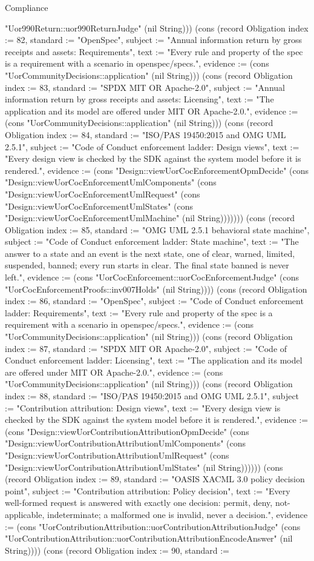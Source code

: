 \begin{lexlean}{Compliance}
\begin{semanticmodule}
{"Uor990Return::uor990ReturnJudge" (nil String))}) (cons (record Obligation {index := 82, standard := "OpenSpec", subject := "Annual information return by gross receipts and assets: Requirements", text := "Every rule and property of the spec is a requirement with a scenario in openspec/specs.", evidence := (cons "UorCommunityDecisions::application" (nil String))}) (cons (record Obligation {index := 83, standard := "SPDX MIT OR Apache-2.0", subject := "Annual information return by gross receipts and assets: Licensing", text := "The application and its model are offered under MIT OR Apache-2.0.", evidence := (cons "UorCommunityDecisions::application" (nil String))}) (cons (record Obligation {index := 84, standard := "ISO/PAS 19450:2015 and OMG UML 2.5.1", subject := "Code of Conduct enforcement ladder: Design views", text := "Every design view is checked by the SDK against the system model before it is rendered.", evidence := (cons "Design::viewUorCocEnforcementOpmDecide" (cons "Design::viewUorCocEnforcementUmlComponents" (cons "Design::viewUorCocEnforcementUmlRequest" (cons "Design::viewUorCocEnforcementUmlStates" (cons "Design::viewUorCocEnforcementUmlMachine" (nil String))))))}) (cons (record Obligation {index := 85, standard := "OMG UML 2.5.1 behavioral state machine", subject := "Code of Conduct enforcement ladder: State machine", text := "The answer to a state and an event is the next state, one of clear, warned, limited, suspended, banned; every run starts in clear. The final state banned is never left.", evidence := (cons "UorCocEnforcement::uorCocEnforcementJudge" (cons "UorCocEnforcementProofs::inv007Holds" (nil String)))}) (cons (record Obligation {index := 86, standard := "OpenSpec", subject := "Code of Conduct enforcement ladder: Requirements", text := "Every rule and property of the spec is a requirement with a scenario in openspec/specs.", evidence := (cons "UorCommunityDecisions::application" (nil String))}) (cons (record Obligation {index := 87, standard := "SPDX MIT OR Apache-2.0", subject := "Code of Conduct enforcement ladder: Licensing", text := "The application and its model are offered under MIT OR Apache-2.0.", evidence := (cons "UorCommunityDecisions::application" (nil String))}) (cons (record Obligation {index := 88, standard := "ISO/PAS 19450:2015 and OMG UML 2.5.1", subject := "Contribution attribution: Design views", text := "Every design view is checked by the SDK against the system model before it is rendered.", evidence := (cons "Design::viewUorContributionAttributionOpmDecide" (cons "Design::viewUorContributionAttributionUmlComponents" (cons "Design::viewUorContributionAttributionUmlRequest" (cons "Design::viewUorContributionAttributionUmlStates" (nil String)))))}) (cons (record Obligation {index := 89, standard := "OASIS XACML 3.0 policy decision point", subject := "Contribution attribution: Policy decision", text := "Every well-formed request is answered with exactly one decision: permit, deny, not-applicable, indeterminate; a malformed one is invalid, never a decision.", evidence := (cons "UorContributionAttribution::uorContributionAttributionJudge" (cons "UorContributionAttribution::uorContributionAttributionEncodeAnswer" (nil String)))}) (cons (record Obligation {index := 90, standard := }
\end{semanticmodule}
\end{lexlean}
